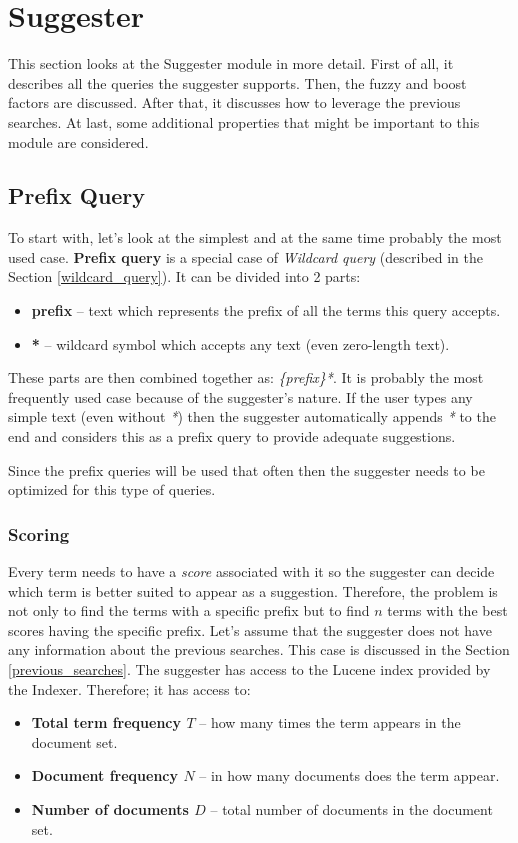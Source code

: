 \section{Suggester}
\label{suggester_module}
This section looks at the Suggester module in more detail. First of all, it describes all the queries the suggester supports.
Then, the fuzzy and boost factors are discussed. After that, it discusses how to leverage the previous searches. At last, some
additional properties that might be important to this module are considered.

\subsection{Prefix Query}
\label{prefix_query}
To start with, let's look at the simplest and at the same time probably the most used case. \textbf{Prefix query} is a special case of
\textit{Wildcard query} (described in the Section \ref{wildcard_query}).
It can be divided into 2 parts:
\begin{itemize}
    \item \textbf{prefix} – text which represents the prefix of all the terms this query accepts.
    \item \textbf{*} – wildcard symbol which accepts any text (even zero-length text).
\end{itemize}

These parts are then combined together as: \textit{\{prefix\}*}.
It is probably the most frequently used case because of the suggester's nature. If the user types any simple text (even without \textit{*}) then
the suggester automatically appends \textit{*} to the end and considers this as a prefix query to provide adequate suggestions.

Since the prefix queries will be used that often then the suggester needs to be optimized for this type of queries.

\subsubsection{Scoring}
\label{prefix_scoring}
Every term needs to have a \textit{score} associated with it so the suggester can decide which term is better suited
to appear as a suggestion. Therefore, the problem is not only to find the terms with a specific prefix but to find $n$
terms with the best scores having the specific prefix. Let's assume that the suggester does not have any information
about the previous searches. This case is discussed in
the Section \ref{previous_searches}. The suggester has access to the Lucene index provided by the Indexer.
Therefore; it has access to:
\begin{itemize}
    \item \textbf{Total term frequency $T$} – how many times the term appears in the document set.
    \item \textbf{Document frequency $N$} – in how many documents does the term appear.
    \item \textbf{Number of documents $D$} – total number of documents in the document set.
\end{itemize}

